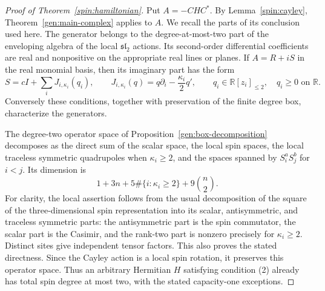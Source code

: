 \documentclass[reqno]{amsart}
\theoremstyle{definition}
\theoremstyle{remark}
\newcommand{\R}{\mathbb R}
\begin{document}
\begin{proof}[Proof of Theorem~\ref{spin:hamiltonian}]
Put $A=-CHC^*$.  By Lemma~\ref{spin:cayley},
Theorem~\ref{gen:main-complex} applies to $A$.  We recall the parts of its conclusion
used here.  The generator belongs to the degree-at-most-two part of the
enveloping algebra of the local $\mathfrak{sl}_2$ actions.  Its
second-order differential coefficients are real and nonpositive on the
appropriate real lines or planes.  If $A=R+iS$ in the real monomial
basis, then its imaginary part has the form
\begin{equation}\label{spin:imaginary-wedge}
 S=cI+\sum_iJ_{i,\kappa_i}(q_i),\qquad
 J_{i,\kappa_i}(q)=q\partial_i-\frac{\kappa_i}{2}q',\qquad
 q_i\in\R[z_i]_{\leq2},\quad q_i\geq0\text{ on }\R.
\end{equation}
Conversely these conditions, together with preservation of the finite
degree box, characterize the generators.

The degree-two operator space of Proposition~\ref{gen:box-decomposition}
decomposes as the direct sum of the scalar
space, the local spin spaces, the local traceless symmetric quadrupoles
when $\kappa_i\geq2$, and the spaces spanned by
$S_i^aS_j^b$ for $i<j$.  Its dimension is
\begin{equation}\label{spin:degree-two-dimension}
 1+3n+5\#\{i:\kappa_i\geq2\}+9\binom n2.
\end{equation}
For clarity, the local assertion follows from the usual decomposition of
the square of the three-dimensional spin representation into its scalar,
antisymmetric, and traceless symmetric parts: the antisymmetric part is
the spin commutator, the scalar part is the Casimir, and the rank-two
part is nonzero precisely for $\kappa_i\geq2$.  Distinct sites give
independent tensor factors.  This also proves the stated directness.
Since the Cayley action is a local spin rotation, it preserves this
operator space.  Thus an arbitrary Hermitian $H$ satisfying condition (2)
already has total spin degree at most two, with the stated capacity-one
exceptions.


\end{proof}
\end{document}
